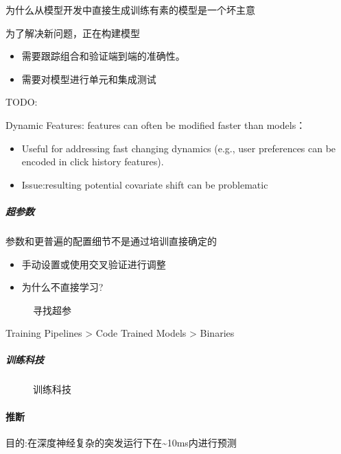 \documentclass[letterpaper,10pt,english]{sphinxmanual}
\begin{document}
为什么从模型开发中直接生成训练有素的模型是一个坏主意

为了解决新问题，正在构建模型
\begin{itemize}
\item {} 
需要跟踪组合和验证端到端的准确性。

\item {} 
需要对模型进行单元和集成测试

\end{itemize}

TODO:

Dynamic Features: features can often be modified faster than models：
\begin{itemize}
\item {} 
Useful for addressing fast changing dynamics (e.g., user preferences
can be encoded in click history features).

\item {} 
Issue:resulting potential covariate shift can be problematic

\end{itemize}


\subparagraph{超参数}
\label{\detokenize{chapter_project/Model Process:id6}}
参数和更普遍的配置细节不是通过培训直接确定的
\begin{itemize}
\item {} 
手动设置或使用交叉验证进行调整

\item {} 
为什么不直接学习?

\end{itemize}

\begin{figure}[H]
\centering
\capstart

\noindent{}
\caption{寻找超参}\label{\detokenize{chapter_project/Model Process:id13}}\end{figure}

Training Pipelines \sphinxhyphen{}> Code Trained Models \sphinxhyphen{}> Binaries


\subparagraph{训练科技}
\label{\detokenize{chapter_project/Model Process:id7}}
\begin{figure}[H]
\centering
\capstart

\noindent{}
\caption{训练科技}\label{\detokenize{chapter_project/Model Process:id14}}\end{figure}


\paragraph{推断}
\label{\detokenize{chapter_project/Model Process:id8}}
目的:在深度神经复杂的突发运行下在\textasciitilde{}10ms内进行预测
\end{document}
